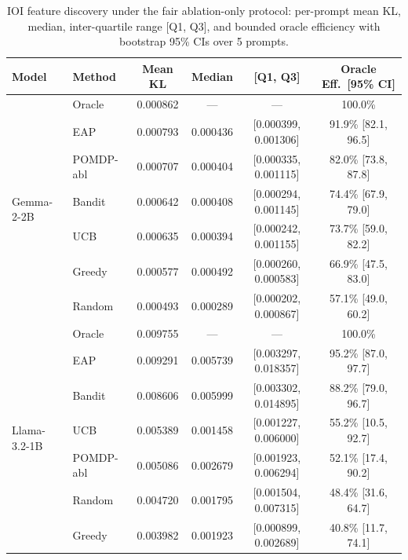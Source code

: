 \begin{table}[H]
\centering
\caption{IOI feature discovery under the fair ablation-only protocol:
per-prompt mean KL, median, inter-quartile range [Q1, Q3], and bounded
oracle efficiency with bootstrap 95\% CIs over 5 prompts.}
\label{tab:ioi}
{\small
\begin{tabular}{llcccc}
\toprule
\textbf{Model} & \textbf{Method} & \textbf{Mean KL} & \textbf{Median} & \textbf{[Q1, Q3]} & \textbf{Oracle Eff.\ [95\% CI]} \\
\midrule
\multirow{7}{*}{Gemma-2-2B}
 & Oracle      & 0.000862 & ---      & ---                    & 100.0\% \\
 & EAP         & 0.000793 & 0.000436 & [0.000399, 0.001306]   & 91.9\% [82.1, 96.5] \\
 & POMDP-abl   & 0.000707 & 0.000404 & [0.000335, 0.001115]   & 82.0\% [73.8, 87.8] \\
 & Bandit      & 0.000642 & 0.000408 & [0.000294, 0.001145]   & 74.4\% [67.9, 79.0] \\
 & UCB         & 0.000635 & 0.000394 & [0.000242, 0.001155]   & 73.7\% [59.0, 82.2] \\
 & Greedy      & 0.000577 & 0.000492 & [0.000260, 0.000583]   & 66.9\% [47.5, 83.0] \\
 & Random      & 0.000493 & 0.000289 & [0.000202, 0.000867]   & 57.1\% [49.0, 60.2] \\
\midrule
\multirow{7}{*}{Llama-3.2-1B}
 & Oracle      & 0.009755 & ---      & ---                    & 100.0\% \\
 & EAP         & 0.009291 & 0.005739 & [0.003297, 0.018357]   & 95.2\% [87.0, 97.7] \\
 & Bandit      & 0.008606 & 0.005999 & [0.003302, 0.014895]   & 88.2\% [79.0, 96.7] \\
 & UCB         & 0.005389 & 0.001458 & [0.001227, 0.006000]   & 55.2\% [10.5, 92.7] \\
 & POMDP-abl   & 0.005086 & 0.002679 & [0.001923, 0.006294]   & 52.1\% [17.4, 90.2] \\
 & Random      & 0.004720 & 0.001795 & [0.001504, 0.007315]   & 48.4\% [31.6, 64.7] \\
 & Greedy      & 0.003982 & 0.001923 & [0.000899, 0.002689]   & 40.8\% [11.7, 74.1] \\
\bottomrule
\end{tabular}
}
\end{table}

